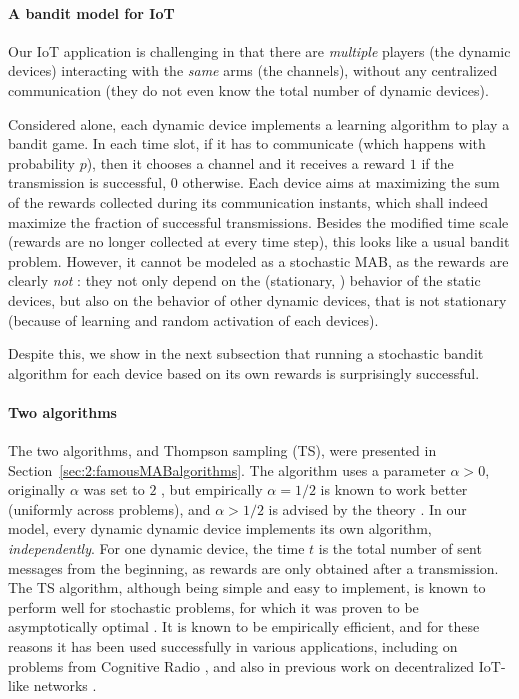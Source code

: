 \paragraph{A bandit model for IoT}

Our IoT application is challenging in that there are \emph{multiple} players (the dynamic devices) interacting with the \emph{same} arms (the channels), without any centralized communication (they do not even know the total number of dynamic devices).

Considered alone, each dynamic device implements a learning algorithm to play a bandit game.
In each time slot, if it has to communicate (which happens with probability $p$), then it chooses a channel and it receives a reward $1$ if the transmission is successful, $0$ otherwise.
Each device aims at maximizing the sum of the rewards collected during its communication instants, which shall indeed maximize the fraction of successful transmissions. Besides the modified time scale (rewards are no longer collected at every time step), this looks like a usual bandit problem.
However, it cannot be modeled as a stochastic MAB, as the rewards are clearly \emph{not} \iid: they not only depend on the (stationary, \iid) behavior of the static devices, but also on the behavior of other dynamic devices, that is not stationary (because of learning and random activation of each devices).

Despite this, we show in the next subsection that running a stochastic bandit algorithm for each device based on its own rewards is surprisingly successful.

\paragraph{Two algorithms}

The two algorithms, \UCB{} and Thompson sampling (TS), were presented in Section~\ref{sec:2:famousMABalgorithms}.
The \UCB{} algorithm uses a parameter $\alpha > 0$, originally $\alpha$ was set to $2$ \cite{Auer02}, but empirically $\alpha = 1/2$ is known to work better (uniformly across problems), and $\alpha > 1/2$ is advised by the theory \cite{Bubeck12}.
%
In our model, every dynamic dynamic device implements its own \UCB{} algorithm, \emph{independently}.
For one dynamic device, the time $t$ is the total number of sent messages from the beginning, as rewards are only obtained after a transmission.
%
The TS algorithm, although being simple and easy to implement, is known to perform well for stochastic problems, for which it was proven to be asymptotically optimal \cite{AgrawalGoyal11,Kaufmann12Thompson}.
It is known to be empirically efficient, and for these reasons it has been used successfully in various applications, including on problems from Cognitive Radio \cite{Toldov16,Mitton16}, and also in previous work on decentralized IoT-like networks \cite{Darak16}.


